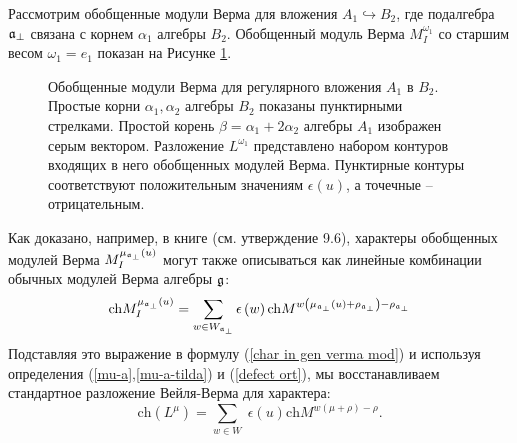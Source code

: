 \begin{example}
  Рассмотрим обобщенные модули Верма для вложения $A_{1}\hookrightarrow B_{2}$, где подалгебра  $\mathfrak{a}_{\perp}$ связана с корнем  $\alpha_{1}$ алгебры  $B_{2}$. Обобщенный модуль Верма $M^{\omega_{1}}_{I}$ со старшим весом   $\omega_{1}=e_{1}$ показан на Рисунке \ref{fig:B2_Verma_Decomp}.
  \begin{figure}[h!bt]
  \noindent{}
  \caption{Обобщенные модули Верма для регулярного вложения  $A_1$ в $B_2$. 
    Простые корни $\alpha_1, \alpha_2$ алгебры $B_2$ показаны пунктирными стрелками. Простой корень  $\beta = \alpha_1+2\alpha_2$ алгебры $A_1$ изображен серым вектором. Разложение $L^{\omega_{1}}$ представлено набором контуров входящих в него обобщенных модулей Верма. Пунктирные контуры соответствуют положительным значениям  $\epsilon(u)$, а точечные -- отрицательным. }

 \label{fig:B2_Verma_Decomp}
\end{figure}

\end{example}

\begin{remark}
Как доказано, например, в книге  \cite{humphreys2008representations} (см. утверждение 9.6), характеры обобщенных модулей Верма $M_{I}^{\mu _{\frak{a}_{\perp }}\left( u\right) }$ могут также описываться как линейные комбинации обычных модулей Верма алгебры $\frak{g}$:
\begin{equation*}
\mathrm{ch}M_{I}^{\mu _{\frak{a}_{\perp }}\left( u\right) }=\sum_{w\in W_{%
\frak{a}_{\perp }}}\epsilon \left( w\right) \mathrm{ch}M^{w\left( \mu _{%
\frak{a}_{\perp }}\left( u\right) +\rho _{\frak{a}_{\perp }}\right) -\rho _{%
\frak{a}_{\perp }}}
\end{equation*}
Подставляя это выражение в формулу (\ref{char in gen verma mod}) и используя определения  (\ref{mu-a},\ref{mu-a-tilda}) и (\ref{defect ort}), мы восстанавливаем стандартное разложение Вейля-Верма для характера:
\begin{equation*}
\mathrm{ch}\left( L^{\mu }\right) =\sum_{w\in W}\;\epsilon (u)\mathrm{ch}%
M^{w\left( \mu +\rho \right) -\rho }.
\end{equation*}
\end{remark}

